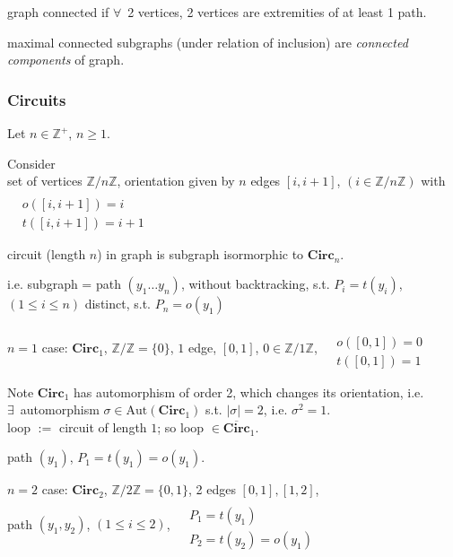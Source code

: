\begin{definition}
	graph connected if $\forall \, $ 2 vertices, 2 vertices are extremities of at least 1 path.  
	
	maximal connected subgraphs (under relation of inclusion) are \emph{connected components} of graph.  
\end{definition}

\subsubsection{Circuits}  

Let $n\in \mathbb{Z}^+$, $n\geq 1$.  

Consider \\
set of vertices $\mathbb{Z}/n\mathbb{Z}$, orientation given by $n$ edges $[i,i+1]$, $(i\in \mathbb{Z}/n\mathbb{Z})$ with $\begin{aligned} & \quad \\
 & o([i,i+1]) = i \\
 & t([i,i+1]) = i+1 \end{aligned}$

\begin{definition}
	circuit (length $n$) in graph is subgraph isormorphic to $\mathbf{\text{Circ}}_n$.  
\end{definition}
i.e. subgraph = path $(y_1\dots y_n)$, without backtracking, s.t. $P_i = t(y_i)$, \, $(1\leq i \leq n)$ distinct, s.t. $P_n = o(y_1)$

$n=1$ case: $\mathbf{\text{Circ}}_1$, $\mathbb{Z}/\mathbb{Z} = \lbrace 0 \rbrace$, $1$ edge, $[0,1]$, $0 \in \mathbb{Z}/1\mathbb{Z}$, $\begin{aligned} & \quad \\
	& o([0,1]) = 0 \\
	& t([0,1]) = 1 \end{aligned}$  
	
	Note $\mathbf{\text{Circ}}_1$ has automorphism of order 2, which changes its orientation, i.e. \\
	$\exists \, $ automorphism $\sigma \in \text{Aut}( \mathbf{\text{Circ}}_1) $ s.t. $|\sigma | = 2$, i.e. $\sigma^2=1$.  \\
	loop $:= $ circuit of length $1$; so loop $\in \overline{ \mathbf{\text{Circ}} }_1$.  
	
	path $(y_1)$, $P_1 = t(y_1) = o(y_1)$.  
	
	$n=2$ case: $\mathbf{\text{Circ}}_2$, $\mathbb{Z}/2\mathbb{Z} = \lbrace 0 ,1\rbrace$, 2 edges $[0,1], [1,2]$,  \\
	path $(y_1,y_2)$, $(1\leq i \leq 2)$, $\begin{aligned} & \quad \\
		& P_1 = t(y_1) \\
		& P_2 = t(y_2) = o(y_1) \end{aligned}$  
		
